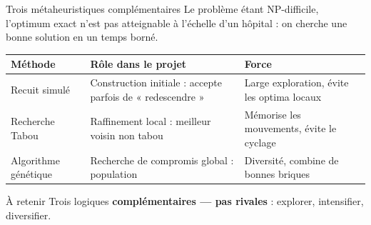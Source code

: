 \begin{frame}{Trois métaheuristiques complémentaires}
  \footnotesize
  Le problème étant NP-difficile, l'optimum exact n'est pas atteignable à
  l'échelle d'un hôpital : on cherche une bonne solution en un temps borné.

  \vspace{0.15cm}
  \renewcommand{\arraystretch}{1.12}
  \begin{tabular}{p{3.2cm}p{4.3cm}p{4.6cm}}
    \toprule
    \textbf{Méthode} & \textbf{Rôle dans le projet} & \textbf{Force} \\
    \midrule
    Recuit simulé & Construction initiale : accepte parfois de « redescendre »
      & Large exploration, évite les optima locaux \\
    Recherche Tabou & Raffinement local : meilleur voisin non tabou
      & Mémorise les mouvements, évite le cyclage \\
    Algorithme génétique & Recherche de compromis global : population
      & Diversité, combine de bonnes briques \\
    \bottomrule
  \end{tabular}

  \vspace{0.2cm}
  \begin{alertblock}{À retenir}
    Trois logiques \textbf{complémentaires --- pas rivales} : explorer,
    intensifier, diversifier.
  \end{alertblock}
\end{frame}

